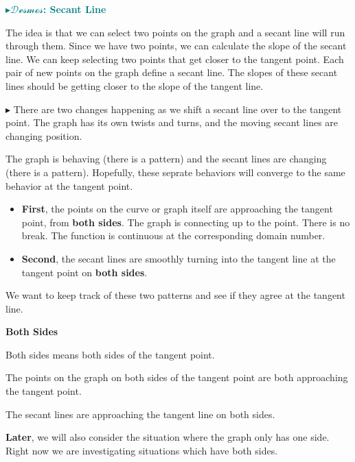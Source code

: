 \documentclass{ximera}
\begin{document}
\begin{onlineOnly}
\textbf{\textcolor{teal}{$\blacktriangleright \mathcal{Desmos}$: Secant Line}} 
\begin{center}
\end{center}
\end{onlineOnly}


The idea is that we can select two points on the graph and a secant line will run through them. Since we have two points, we can calculate the slope of the secant line. We can keep selecting two points that get closer to the tangent point. Each pair of new points on the graph define a secant line. The slopes of these secant lines should be getting closer to the slope of the tangent line. 




\textbf{\textcolor{red!70!darkgray}{$\blacktriangleright$}} There are two changes happening as we shift a secant line over to the tangent point. The graph has its own twists and turns, and the moving secant lines are changing position. 

The graph is behaving (there is a pattern) and the secant lines are changing (there is a pattern). Hopefully, these seprate behaviors will converge to the same behavior at the tangent point.



\begin{itemize}
\item \textbf{First}, the points on the curve or graph itself are approaching the tangent point, from \textbf{both sides}. The graph is connecting up to the point. There is no break. The function is continuous at the corresponding domain number.
\item \textbf{Second}, the secant lines are smoothly turning into the tangent line at the tangent point on \textbf{both sides}. 
\end{itemize}



We want to keep track of these two patterns and see if they agree at the tangent line. 


\begin{warning} \textbf{\textcolor{red!70!black}{Both Sides}}

Both sides means both sides of the tangent point. 

The points on the graph on both sides of the tangent point are both approaching the tangent point. 

The secant lines are approaching the tangent line on both sides.




\end{warning}
\textbf{Later}, we will also consider the situation where the graph only has one side. Right now we are investigating situations which have both sides.
\end{document}
